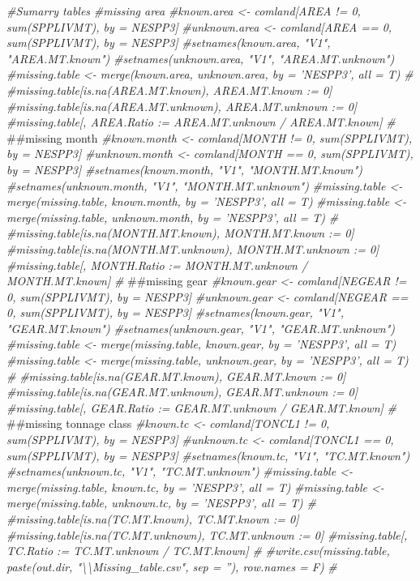 \documentclass[]{article}
\newenvironment{Shaded}{\begin{snugshade}}{\end{snugshade}}
\newcommand{\CommentTok}[1]{\textcolor[rgb]{0.56,0.35,0.01}{\textit{#1}}}
\newcommand{\NormalTok}[1]{#1}
\begin{document}
\begin{Shaded}
\begin{Highlighting}[]
{{{{{{\CommentTok{#Sumarry tables}
\CommentTok{#missing area}
\CommentTok{#known.area <-   comland[AREA != 0, sum(SPPLIVMT), by = NESPP3]}
\CommentTok{#unknown.area <- comland[AREA == 0, sum(SPPLIVMT), by = NESPP3]}
\CommentTok{#setnames(known.area,   "V1", "AREA.MT.known")}
\CommentTok{#setnames(unknown.area, "V1", "AREA.MT.unknown")}
\CommentTok{#missing.table <- merge(known.area, unknown.area, by = 'NESPP3', all = T)}
\CommentTok{#}
\CommentTok{#missing.table[is.na(AREA.MT.known),   AREA.MT.known   := 0]}
\CommentTok{#missing.table[is.na(AREA.MT.unknown), AREA.MT.unknown := 0]}
\CommentTok{#missing.table[, AREA.Ratio := AREA.MT.unknown / AREA.MT.known]}
\CommentTok{#}
\NormalTok{##missing month}
\CommentTok{#known.month <-   comland[MONTH != 0, sum(SPPLIVMT), by = NESPP3]}
\CommentTok{#unknown.month <- comland[MONTH == 0, sum(SPPLIVMT), by = NESPP3]}
\CommentTok{#setnames(known.month,   "V1", "MONTH.MT.known")}
\CommentTok{#setnames(unknown.month, "V1", "MONTH.MT.unknown")}
\CommentTok{#missing.table <- merge(missing.table, known.month,   by = 'NESPP3', all = T)}
\CommentTok{#missing.table <- merge(missing.table, unknown.month, by = 'NESPP3', all = T)}
\CommentTok{#}
\CommentTok{#missing.table[is.na(MONTH.MT.known),   MONTH.MT.known   := 0]}
\CommentTok{#missing.table[is.na(MONTH.MT.unknown), MONTH.MT.unknown := 0]}
\CommentTok{#missing.table[, MONTH.Ratio := MONTH.MT.unknown / MONTH.MT.known]}
\CommentTok{#}
\NormalTok{##missing gear}
\CommentTok{#known.gear <-   comland[NEGEAR != 0, sum(SPPLIVMT), by = NESPP3]}
\CommentTok{#unknown.gear <- comland[NEGEAR == 0, sum(SPPLIVMT), by = NESPP3]}
\CommentTok{#setnames(known.gear,   "V1", "GEAR.MT.known")}
\CommentTok{#setnames(unknown.gear, "V1", "GEAR.MT.unknown")}
\CommentTok{#missing.table <- merge(missing.table, known.gear,   by = 'NESPP3', all = T)}
\CommentTok{#missing.table <- merge(missing.table, unknown.gear, by = 'NESPP3', all = T)}
\CommentTok{#}
\CommentTok{#missing.table[is.na(GEAR.MT.known),   GEAR.MT.known   := 0]}
\CommentTok{#missing.table[is.na(GEAR.MT.unknown), GEAR.MT.unknown := 0]}
\CommentTok{#missing.table[, GEAR.Ratio := GEAR.MT.unknown / GEAR.MT.known]}
\CommentTok{#}
\NormalTok{##missing tonnage class}
\CommentTok{#known.tc <-   comland[TONCL1 != 0, sum(SPPLIVMT), by = NESPP3]}
\CommentTok{#unknown.tc <- comland[TONCL1 == 0, sum(SPPLIVMT), by = NESPP3]}
\CommentTok{#setnames(known.tc,   "V1", "TC.MT.known")}
\CommentTok{#setnames(unknown.tc, "V1", "TC.MT.unknown")}
\CommentTok{#missing.table <- merge(missing.table, known.tc,   by = 'NESPP3', all = T)}
\CommentTok{#missing.table <- merge(missing.table, unknown.tc, by = 'NESPP3', all = T)}
\CommentTok{#}
\CommentTok{#missing.table[is.na(TC.MT.known),   TC.MT.known   := 0]}
\CommentTok{#missing.table[is.na(TC.MT.unknown), TC.MT.unknown := 0]}
\CommentTok{#missing.table[, TC.Ratio := TC.MT.unknown / TC.MT.known]}
\CommentTok{#}
\CommentTok{#write.csv(missing.table, paste(out.dir, "\textbackslash{}\textbackslash{}Missing_table.csv", sep = ''), row.names = F)}
\CommentTok{#}

}}}}}}
\end{Highlighting}
\end{Shaded}
\end{document}
